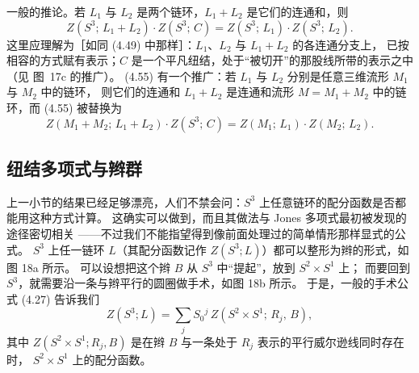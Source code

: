 \documentclass[11pt,a4paper]{article}
\begin{document}
一般的推论。若 $L_1$ 与 $L_2$ 是两个链环，$L_1+L_2$ 是它们的连通和，则
\begin{equation}
    Z(S^3;\, L_1+L_2)\cdot Z(S^3;\, C) = Z(S^3;\, L_1)\cdot Z(S^3;\, L_2).
    \tag{4.55}
\end{equation}
这里应理解为［如同 (4.49) 中那样］：$L_1$、$L_2$ 与 $L_1+L_2$ 的各连通分支上，
已按相容的方式赋有表示；$C$ 是一个平凡纽结，处于“被切开”的那股线所带的表示之中
（见 图~17c 的推广）。
(4.55) 有一个推广：若 $L_1$ 与 $L_2$ 分别是任意三维流形 $M_1$ 与 $M_2$ 中的链环，
则它们的连通和 $L_1+L_2$ 是连通和流形 $M=M_1+M_2$ 中的链环，而 (4.55) 被替换为
\begin{equation}
    Z(M_1+M_2;\, L_1+L_2)\cdot Z(S^3;\, C) = Z(M_1;\, L_1)\cdot Z(M_2;\, L_2).
    \tag{4.56}
\end{equation}


\subsection{纽结多项式与辫群}

上一小节的结果已经足够漂亮，人们不禁会问：$S^3$ 上任意链环的配分函数是否都能用这种方式计算。
这确实可以做到，而且其做法与 Jones 多项式最初被发现的途径密切相关
——不过我们不能指望得到像前面处理过的简单情形那样显式的公式。
$S^3$ 上任一链环 $L$（其配分函数记作 $Z(S^3;L)$）都可以整形为辫的形式，如图 18a 所示。
可以设想把这个辫 $B$ 从 $S^3$ 中“提起”，放到 $S^2\times S^1$ 上；
而要回到 $S^3$，就需要沿一条与辫平行的圆圈做手术，如图 18b 所示。
于是，一般的手术公式 (4.27) 告诉我们
\begin{equation}
    Z(S^3;L) = \sum_j S_0{}^j\, Z(S^2\times S^1;\, R_j,\, B),
    \tag{4.57}
\end{equation}
其中 $Z(S^2\times S^1; R_j, B)$ 是在辫 $B$ 与一条处于 $R_j$ 表示的平行威尔逊线同时存在时，
$S^2\times S^1$ 上的配分函数。
\end{document}
